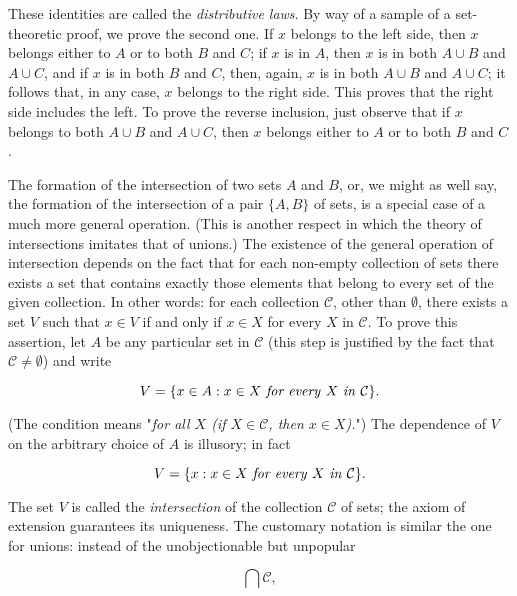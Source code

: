 These identities are called the \textit{distributive laws}. By way of a sample of a set-theoretic proof, we prove the second one. If $x$ belongs to the left side, then $x$ belongs either to $A$ or to both $B$ and $C$; if $x$ is in $A$, then $x$ is in both $A \cup B$ and $A \cup C$, and if $x$ is in both $B$ and $C$, then, again, $x$ is in both $A \cup B$ and $A \cup C$; it follows that, in any case, $x$ belongs to the right side. This proves that the right side includes the left. To prove the reverse inclusion, just observe that if $x$ belongs to both $A \cup B$ and $A \cup C$, then $x$ belongs either to $A$ or to both $B$ and $C$. 

The formation of the intersection of two sets $A$ and $B$, or, we might as well say, the formation of the intersection of a pair $ \{ A, B \} $ of sets, is a special case of a much more general operation. (This is another respect in which the theory of intersections imitates that of unions.) The existence of the general operation of intersection depends on the fact that for each non-empty collection of sets there exists a set that contains exactly those elements that belong to every set of the given collection. In other words: for each collection $\mathcal{C}$, other than $ \emptyset $, there exists a set $V$ such that $x \in V$ if and only if $x \in X$ for every $X$ in $\mathcal{C}$. To prove this assertion, let $A$ be any particular set in $\mathcal{C}$ (this step is justified by the fact that $\mathcal{C} \neq \emptyset$) and write

\begin{equation*}
V = \{ x \in A: x \in X \text{ \textit{for every} } X \text{ \textit{in} } \mathcal{C} \}.
\end{equation*}

(The condition means "\textit{for all $X$ (if $X \in \mathcal{C}$, then $x \in X$).}") The dependence of $V$ on the arbitrary choice of $A$ is illusory; in fact

\begin{equation*}
V = \{ x : x \in X \text{ \textit{for every} } X \text{ \textit{in} } \mathcal{C} \}.
\end{equation*}

The set $V$ is called the \textit{intersection} of the collection $ \mathcal{C} $ of sets; the axiom of extension guarantees its uniqueness. The customary notation is similar the one for unions: instead of the unobjectionable but unpopular

\begin{equation*}
\bigcap \mathcal{C} ,
\end{equation*}

